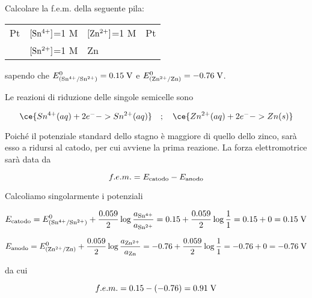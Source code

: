 \begin{esercizio}
    Calcolare la f.e.m. della seguente pila:

\begin{center}
    \begin{tabular}{p{0.6cm}|p{3cm}||p{3cm}|p{1cm}}
        Pt & $[\rm Sn^{4+}]$=1 M & $[\rm Zn^{2+}]$=1 M & Pt\\[0.5ex]
        & $[\rm Sn^{2+}]$=1 M & Zn &\\[0.5ex]
    \end{tabular}
\end{center}

sapendo che $E^0_{(\rm Sn^{4+}/Sn^{2+})}=0.15 \; \rm V$ e $E^0_{(\rm Zn^{2+}/Zn)}=-0.76 \; \rm V$.
\end{esercizio}
\begin{soluzione}
    Le reazioni di riduzione delle singole semicelle sono

$$\ce{Sn^{4+}(aq) + 2 e^- -> Sn^{2+}(aq)}
\quad;\quad
\ce{Zn^{2+}(aq) + 2 e^- -> Zn(s)}$$

Poiché il potenziale standard dello stagno è maggiore di quello dello zinco, sarà esso a ridursi al catodo, per cui avviene la prima reazione. La forza elettromotrice sarà data da

$$f.e.m. = E_{\rm catodo} - E_{\rm anodo}$$

Calcoliamo singolarmente i potenziali

$$E_{\rm catodo}
=E^0_{(\rm Sn^{4+}/Sn^{2+})} + \frac{0.059}{2} \log \frac{a_{\rm Sn^{4+}}}{a_{\rm Sn^{2+}}}
=0.15 + \frac{0.059}{2} \log \frac{1}{1}
=0.15 + 0 = 0.15 \; \rm V$$

$$E_{\rm anodo} = E^0_{(\rm Zn^{2+}/Zn)} + \frac{0.059}{2} \log \frac{a_{\rm Zn^{2+}}}{a_{\rm Zn}}
=-0.76 + \frac{0.059}{2} \log \frac{1}{1}
= -0.76 + 0=-0.76 \; \rm V$$

da cui

$$f.e.m.=0.15 - (-0.76) = 0.91 \; \rm V$$
\end{soluzione}

\newpage

